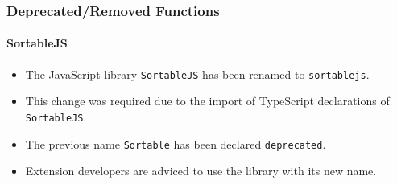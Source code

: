 %

\begin{frame}[fragile]
	\frametitle{Deprecated/Removed Functions}
	\framesubtitle{SortableJS}

	\begin{itemize}
		\item The JavaScript library \texttt{SortableJS} has been renamed to \texttt{sortablejs}.
		\item This change was required due to the import of TypeScript declarations
			of \texttt{SortableJS}.
		\item The previous name \texttt{Sortable} has been declared \texttt{deprecated}.
		\item Extension developers are adviced to use the library with its new name.
	\end{itemize}

\end{frame}

